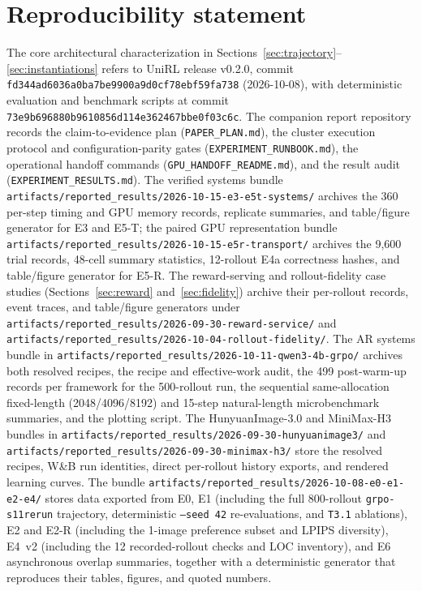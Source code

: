 \documentclass[10pt]{article}
\newcommand{\codepath}[1]{\texttt{#1}}
\begin{document}
\section*{Reproducibility statement}

The core architectural characterization in Sections~\ref{sec:trajectory}--\ref{sec:instantiations} refers to UniRL release v0.2.0, commit
{\small\texttt{fd344ad6036a0ba7be9900a9d0cf78ebf59fa738}} (2026-10-08), with deterministic evaluation and benchmark scripts at commit {\small\texttt{73e9b696880b9610856d114e362467bbe0f03c6c}}.
The companion report repository records the claim-to-evidence plan (\codepath{PAPER\_PLAN.md}), the cluster execution protocol and configuration-parity gates (\codepath{EXPERIMENT\_RUNBOOK.md}), the operational handoff commands (\codepath{GPU\_HANDOFF\_README.md}), and the result audit (\codepath{EXPERIMENT\_RESULTS.md}).
The verified systems bundle \codepath{artifacts/reported\_results/2026-10-15-e3-e5t-systems/} archives the 360 per-step timing and GPU memory records, replicate summaries, and table/figure generator for E3 and E5-T; the paired GPU representation bundle \codepath{artifacts/reported\_results/2026-10-15-e5r-transport/} archives the 9,600 trial records, 48-cell summary statistics, 12-rollout E4a correctness hashes, and table/figure generator for E5-R.
The reward-serving and rollout-fidelity case studies (Sections~\ref{sec:reward} and~\ref{sec:fidelity}) archive their per-rollout records, event traces, and table/figure generators under \codepath{artifacts/reported\_results/2026-09-30-reward-service/} and \codepath{artifacts/reported\_results/2026-10-04-rollout-fidelity/}.
The AR systems bundle in \codepath{artifacts/reported\_results/2026-10-11-qwen3-4b-grpo/} archives both resolved recipes, the recipe and effective-work audit, the 499 post-warm-up records per framework for the 500-rollout run, the sequential same-allocation fixed-length (2048/4096/8192) and 15-step natural-length microbenchmark summaries, and the plotting script.
The HunyuanImage-3.0 and MiniMax-H3 bundles in \codepath{artifacts/reported\_results/2026-09-30-hunyuanimage3/} and \codepath{artifacts/reported\_results/2026-09-30-minimax-h3/} store the resolved recipes, W\&B run identities, direct per-rollout history exports, and rendered learning curves.
The bundle \codepath{artifacts/reported\_results/2026-10-08-e0-e1-e2-e4/} stores data exported from E0, E1 (including the full 800-rollout \texttt{grpo-s11rerun} trajectory, deterministic \texttt{--seed 42} re-evaluations, and \texttt{T3.1} ablations), E2 and E2-R (including the 1-image preference subset and LPIPS diversity), E4~v2 (including the 12 recorded-rollout checks and LOC inventory), and E6 asynchronous overlap summaries, together with a deterministic generator that reproduces their tables, figures, and quoted numbers.
\end{document}
